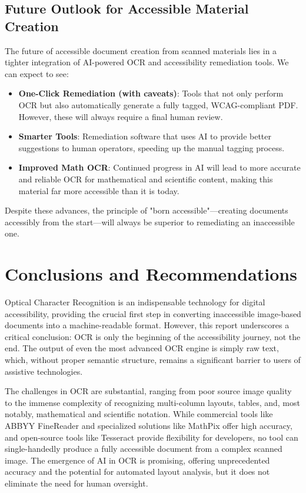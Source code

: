 \subsection{Future Outlook for Accessible Material Creation}
\label{subsec:ocr-future-outlook}
The future of accessible document creation from scanned materials lies in a tighter integration of AI-powered OCR and accessibility remediation tools. We can expect to see:
\begin{itemize}
	\item \textbf{One-Click Remediation (with caveats)}: Tools that not only perform OCR but also automatically generate a fully tagged, WCAG-compliant PDF. However, these will always require a final human review.
	\item \textbf{Smarter Tools}: Remediation software that uses AI to provide better suggestions to human operators, speeding up the manual tagging process.
	\item \textbf{Improved Math OCR}: Continued progress in AI will lead to more accurate and reliable OCR for mathematical and scientific content, making this material far more accessible than it is today.
\end{itemize}
Despite these advances, the principle of "born accessible"—creating documents accessibly from the start—will always be superior to remediating an inaccessible one.

\section{Conclusions and Recommendations}
\label{sec:ocr-conclusion}
Optical Character Recognition is an indispensable technology for digital accessibility, providing the crucial first step in converting inaccessible image-based documents into a machine-readable format. However, this report underscores a critical conclusion: OCR is only the beginning of the accessibility journey, not the end. The output of even the most advanced OCR engine is simply raw text, which, without proper semantic structure, remains a significant barrier to users of assistive technologies.

The challenges in OCR are substantial, ranging from poor source image quality to the immense complexity of recognizing multi-column layouts, tables, and, most notably, mathematical and scientific notation. While commercial tools like ABBYY FineReader and specialized solutions like MathPix offer high accuracy, and open-source tools like Tesseract provide flexibility for developers, no tool can single-handedly produce a fully accessible document from a complex scanned image. The emergence of AI in OCR is promising, offering unprecedented accuracy and the potential for automated layout analysis, but it does not eliminate the need for human oversight.

